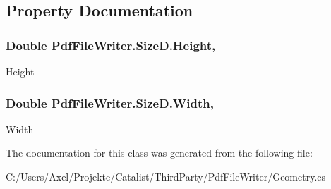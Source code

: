 \subsection{Property Documentation}
\subsubsection[{\texorpdfstring{Height}{Height}}]{\setlength{\rightskip}{0pt plus 5cm}Double Pdf\+File\+Writer.\+Size\+D.\+Height\hspace{0.3cm}{\ttfamily [get]}, {\ttfamily [set]}}\hypertarget{class_pdf_file_writer_1_1_size_d_afdcea8b18b25f110fb8fbfc5524a784c}{}\label{class_pdf_file_writer_1_1_size_d_afdcea8b18b25f110fb8fbfc5524a784c}


Height 

\subsubsection[{\texorpdfstring{Width}{Width}}]{\setlength{\rightskip}{0pt plus 5cm}Double Pdf\+File\+Writer.\+Size\+D.\+Width\hspace{0.3cm}{\ttfamily [get]}, {\ttfamily [set]}}\hypertarget{class_pdf_file_writer_1_1_size_d_a9ce2c829ca30d0827805b5e401379611}{}\label{class_pdf_file_writer_1_1_size_d_a9ce2c829ca30d0827805b5e401379611}


Width 



The documentation for this class was generated from the following file\+:\begin{DoxyCompactItemize}
\item 
C\+:/\+Users/\+Axel/\+Projekte/\+Catalist/\+Third\+Party/\+Pdf\+File\+Writer/Geometry.\+cs\end{DoxyCompactItemize}
